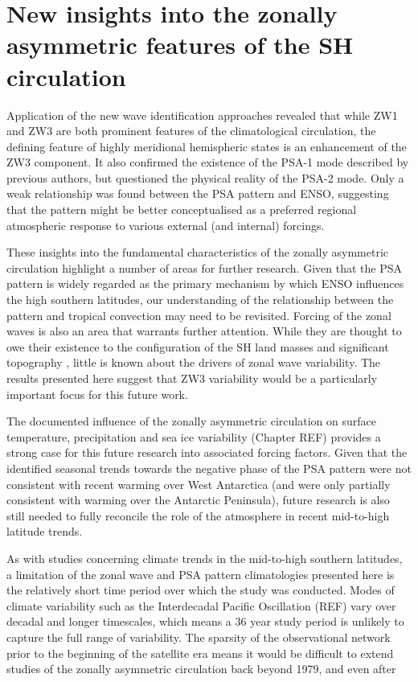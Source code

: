 

\section{New insights into the zonally asymmetric features of the SH circulation}

Application of the new wave identification approaches revealed that while ZW1 and ZW3 are both prominent features of the climatological circulation, the defining feature of highly meridional hemispheric states is an enhancement of the ZW3 component. It also confirmed the existence of the PSA-1 mode described by previous authors, but questioned the physical reality of the PSA-2 mode. Only a weak relationship was found between the PSA pattern and ENSO, suggesting that the pattern might be better conceptualised as a preferred regional atmospheric response to various external (and internal) forcings. 

These insights into the fundamental characteristics of the zonally asymmetric circulation highlight a number of areas for further research. Given that the PSA pattern is widely regarded as the primary mechanism by which ENSO influences the high southern latitudes, our understanding of the relationship between the pattern and tropical convection may need to be revisited. Forcing of the zonal waves is also an area that warrants further attention. While they are thought to owe their existence to the configuration of the SH land masses and significant topography \citep{Baines1989}, little is known about the drivers of zonal wave variability. The results presented here suggest that ZW3 variability would be a particularly important focus for this future work.  

The documented influence of the zonally asymmetric circulation on surface temperature, precipitation and sea ice variability (Chapter REF) provides a strong case for this future research into associated forcing factors. Given that the identified seasonal trends towards the negative phase of the PSA pattern were not consistent with recent warming over West Antarctica (and were only partially consistent with warming over the Antarctic Peninsula), future research is also still needed to fully reconcile the role of the atmosphere in recent mid-to-high latitude trends. 

As with studies concerning climate trends in the mid-to-high southern latitudes, a limitation of the zonal wave and PSA pattern climatologies presented here is the relatively short time period over which the study was conducted. Modes of climate variability such as the Interdecadal Pacific Oscillation (REF) vary over decadal and longer timescales, which means a 36 year study period is unlikely to capture the full range of variability. The sparsity of the observational network prior to the beginning of the satellite era means it would be difficult to extend studies of the zonally asymmetric circulation back beyond 1979, and even after  

